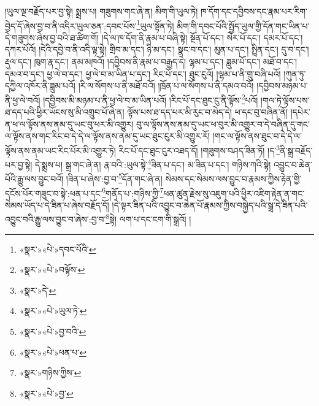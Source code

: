 །ཡུལ་ལྔ་བརྗོད་པར་བྱ་སྟེ། སྨྲས་པ། གཟུགས་གང་ཞེ་ན། མིག་གི་ཡུལ་ཏེ། ཁ་དོག་དང་དབྱིབས་དང་རྣམ་པར་རིག་བྱེད་དོ་ཞེས་བྱ་བ་ནི་འདིར་ཡུལ་ཅན་:དབང་པོས་\footnote{«སྣར་»«པེ་»དབང་པོའི་}ཡུལ་སྟོན་ཏེ། མིག་གི་དབང་པོའི་སྤྱོད་ཡུལ་གྱི་དོན་གང་ཡིན་པ་དེ་གཟུགས་ཞེས་བྱ་བའི་ཐ་ཚིག་གོ། །དེ་ལ་ཁ་དོག་ནི་རྣམ་པ་བཞི་སྟེ། སྔོན་པོ་དང་། སེར་པོ་དང་། དམར་པོ་དང་། དཀར་པོའོ། །དེའི་དབྱེ་བ་ནི་འདི་ལྟ་སྟེ། གྲིབ་མ་དང་། ཉི་མ་དང་། སྣང་བ་དང་། མུན་པ་དང་། སྤྲིན་དང་། དུ་བ་དང་། རྡུལ་དང་། ཁུག་རྣ་དང་། ནམ་མཁའོ། །དབྱིབས་ནི་རྣམ་པ་བརྒྱད་དེ། ལྷམ་པ་དང་། ཟླུམ་པོ་དང་། མཐོ་བ་དང་། དམའ་བ་དང་། ཕྱ་ལེ་བ་དང་། ཕྱ་ལེ་བ་མ་ཡིན་པ་དང་། རིང་པོ་དང་། ཐུང་ངུའོ། །ལྷམ་པ་ནི་གྲུ་བཞི་པའོ། །ཀུན་ཏུ་དཀྱིལ་འཁོར་ནི་ཟླུམ་པའོ། །རི་ལ་སོགས་པ་ནི་མཐོ་བའོ། །ཁྲོན་པ་ལ་སོགས་པ་ནི་དམའ་བའོ། །དབྱིབས་མཉམ་པ་ནི་ཕྱ་ལེ་བའོ། །དབྱིབས་མི་མཉམ་པ་ནི་ཕྱ་ལེ་བ་མ་ཡིན་པའོ། །རིང་པོ་དང་ཐུང་ངུ་ནི་ལྟོས་\footnote{«སྣར་»«པེ་»བལྟོས་}པའོ། །གལ་ཏེ་ལྟོས་པས་ཐ་དད་པའི་ཕྱིར་ཡོངས་སུ་མི་འགྲུབ་པོ་ཞེ་ན། ལྟོས་པས་ཐ་དད་པར་མི་རུང་བ་མེད་དེ། ཕ་དང་བུ་བཞིན་ནོ། །དཔེར་ན་ཕ་ལ་ལྟོས་ནས་ནམ་དུ་ཡང་བུ་ཕར་མི་འགྱུར། བུ་ལ་ལྟོས་ནས་ནམ་དུ་ཡང་ཕ་བུར་མི་འགྱུར་བ་དེ་བཞིན་དུ་གང་ལ་ལྟོས་ནས་གང་རིང་བ་དེ་དེ་ལ་ལྟོས་ནས་ནམ་དུ་ཡང་ཐུང་ངུར་མི་འགྱུར་རོ། །གང་ལ་ལྟོས་ནས་ཐུང་བ་དེ་དེ་ལ་ལྟོས་ནས་ནམ་ཡང་རིང་པོར་མི་འགྱུར་ཏེ། རིང་པོ་དང་ཐུང་ངུར་འཐད་དོ། །གཟུགས་བཤད་ཟིན་ཏོ། །ད་\footnote{«སྣར་»དེ་}ནི་སྒྲ་བརྗོད་པར་བྱ་སྟེ། དེ་སྨྲས་པ། སྒྲ་གང་ཞེ་ན། རྣ་བའི་:ཡུལ་སྟེ་\footnote{«སྣར་»«པེ་»ཡུལ་ཏེ་}ཟིན་པ་དང་། མ་ཟིན་པ་དང་། གཉིས་ཀའི་སྟེ། འབྱུང་བ་ཆེན་པོའི་རྒྱུ་ལས་བྱུང་བའོ། །ཟིན་པ་ཞེས་:བྱ་བ་\footnote{«སྣར་»«པེ་»བྱ་བའི་}དོན་གང་ཞེ་ན། སེམས་དང་སེམས་ལས་བྱུང་བ་རྣམས་ཀྱིས་རྟེན་གྱི་དངོས་པོར་གཟུང་བ་སྟེ་:ཕན་པ་དང་\footnote{«སྣར་»«པེ་»ཕན་པ་}གནོད་པ་:གཉིས་ཀྱི་\footnote{«སྣར་»གཉིས་ཀྱིས་}ཕན་ཚུན་རྗེས་སུ་འཇུག་པའི་ཕྱིར་འཇིག་རྟེན་ན་གང་སེམས་ཡོད་པ་དེ་ཟིན་པ་ཞེས་བརྗོད་དོ། །དེ་ལྟར་ཟིན་པའི་འབྱུང་བ་ཆེན་པོ་རྣམས་ཀྱིས་བསྐྱེད་པའི་སྒྲ་དེ་ཟིན་པའི་འབྱུང་བའི་རྒྱུ་ལས་བྱུང་བ་ཞེས་:བྱ་བ་\footnote{«སྣར་»«པེ་»བྱ་}སྟེ། ལག་པ་དང་ངག་གི་སྒྲའོ། །
